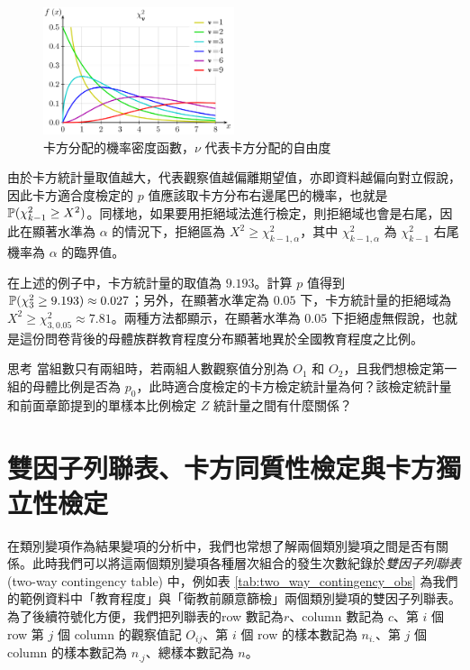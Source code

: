     \begin{figure}[htbp]
        \centering
        \includegraphics[width=0.5\textwidth]{figures/09-Contingency_table_binary_regression/Chi_square.png}
        \caption{卡方分配的機率密度函數，$\nu$ 代表卡方分配的自由度}
        \label{fig:chi_squared}
    \end{figure}

    由於卡方統計量取值越大，代表觀察值越偏離期望值，亦即資料越偏向對立假說，因此卡方適合度檢定的 $p$ 值應該取卡方分布右邊尾巴的機率，也就是 $\mathbb{P}(\chi^2_{k-1} \ge X^2)$。同樣地，如果要用拒絕域法進行檢定，則拒絕域也會是右尾，因此在顯著水準為 $\alpha$ 的情況下，拒絕區為 $X^2 \ge \chi^2_{k-1, \alpha}$，其中 $\chi^2_{k-1, \alpha}$ 為 $\chi^2_{k-1}$ 右尾機率為 $\alpha$ 的臨界值。

    在上述的例子中，卡方統計量的取值為 $9.193$。計算 $p$ 值得到 $\mathbb{P}(\chi^2_3 \ge 9.193) \approx 0.027$；另外，在顯著水準定為 $0.05$ 下，卡方統計量的拒絕域為 $X^2 \ge \chi^2_{3,0.05} \approx 7.81$。兩種方法都顯示，在顯著水準為 $0.05$ 下拒絕虛無假說，也就是這份問卷背後的母體族群教育程度分布顯著地異於全國教育程度之比例。

    \bigskip

    \begin{custom}{思考}
        當組數只有兩組時，若兩組人數觀察值分別為 $O_1$ 和 $O_2$，且我們想檢定第一組的母體比例是否為 $p_0$，此時適合度檢定的卡方檢定統計量為何？該檢定統計量和前面章節提到的單樣本比例檢定 $Z$ 統計量之間有什麼關係？
    \end{custom}
    
\section{雙因子列聯表、卡方同質性檢定與卡方獨立性檢定}

    在類別變項作為結果變項的分析中，我們也常想了解兩個類別變項之間是否有關係。此時我們可以將這兩個類別變項各種層次組合的發生次數紀錄於\textit{雙因子列聯表} (two-way contingency table) 中，例如表 \ref{tab:two_way_contingency_obs} 為我們的範例資料中「教育程度」與「衛教前願意篩檢」兩個類別變項的雙因子列聯表。為了後續符號化方便，我們把列聯表的row 數記為$r$、column 數記為 $c$、第 $i$ 個 row 第 $j$ 個 column 的觀察值記 $O_{ij}$、第 $i$ 個 row 的樣本數記為 $n_{i.}$、第 $j$ 個 column 的樣本數記為 $n_{.j}$、總樣本數記為 $n$。

